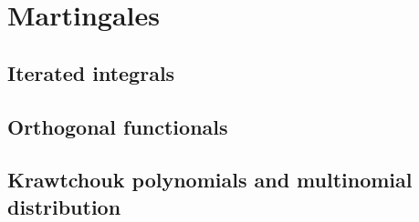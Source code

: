 \chapter{Martingales}
\label{ch:5}
\section{Iterated integrals}
\label{sec:5-1}

\section{Orthogonal functionals}
\label{sec:5-2}

\section{Krawtchouk polynomials and multinomial distribution}
\label{sec:5-3}

